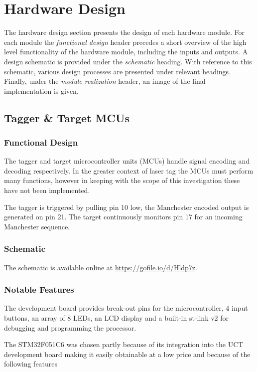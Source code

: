 \section{Hardware Design}
The hardware design section presents the design of each hardware module. For each module the \textit{functional design} header precedes a short overview of the high level functionality of the hardware module, including the inputs and outputs. A design schematic is provided under the \textit{schematic} heading. With reference to this schematic, various design processes are presented under relevant headings. Finally, under the \textit{module realization} header, an image of the final implementation is given.


\subsection{Tagger \& Target MCUs}

\subsubsection{Functional Design}
The tagger and target microcontroller units (MCUs) handle signal encoding and decoding respectively. In the greater context of laser tag the MCUs must perform many functions, however in keeping with the scope of this investigation these have not been implemented.

The tagger is triggered by pulling pin 10 low, the Manchester encoded output is generated on pin 21. The target continuously monitors pin 17 for an incoming Manchester sequence.

\subsubsection{Schematic}
The schematic is available online at \href{https://gofile.io/d/Hldp7z}{https://gofile.io/d/Hldp7z}.


\subsubsection{Notable Features}

The development board provides break-out pins for the microcontroller, 4 input buttons, an array of 8 LEDs, an LCD display and a built-in st-link v2 for debugging and programming the processor.

The STM32F051C6 was chosen partly because of its integration into the UCT development board making it easily obtainable at a low price and because of the following features

